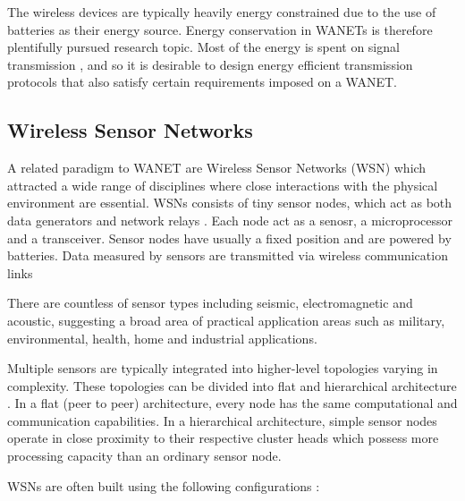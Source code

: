 The wireless devices are typically heavily energy constrained due to the use of batteries as their energy source.
Energy conservation in WANETs is therefore plentifully pursued research topic.
Most of the energy is spent on signal transmission \cite{halgamuge09}, 
and so it is desirable to design energy efficient transmission protocols that also satisfy certain requirements imposed on a WANET.

\subsection{Wireless Sensor Networks}

A related paradigm to WANET are Wireless Sensor Networks (WSN) which attracted a wide range of disciplines where close interactions with the physical environment are essential.
WSNs consists of tiny sensor nodes, which act as both data generators and network relays \cite{akyildiz10}.
Each node act as a senosr, a microprocessor and a transceiver.
Sensor nodes have usually a fixed position and are powered by batteries.
Data measured  by sensors are transmitted via wireless communication links

There are countless of sensor types including seismic, electromagnetic and acoustic, suggesting a broad area of practical application areas such as 
military, environmental, health, home and industrial applications.

Multiple sensors are typically integrated into higher-level topologies varying in complexity.
These topologies can be divided into flat and hierarchical architecture \cite{mcgrath13}.
In a flat (peer to peer) architecture, every node has the same computational and communication capabilities.
In a hierarchical architecture, simple sensor nodes operate in close proximity to their respective cluster heads which possess more processing capacity than an ordinary sensor node.

WSNs are often built using the following configurations \cite{mcgrath13}:

